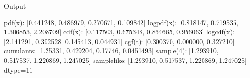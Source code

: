 \documentclass[letterpaper,10pt,english]{sphinxmanual}
\begin{document}
\begin{sphinxVerbatim}[commandchars=\\\{\}]
\end{sphinxVerbatim}

\sphinxAtStartPar
Output

\begin{sphinxVerbatim}[commandchars=\\\{\}]
pdf(x):      [0.441248, 0.486979, 0.270671, 0.109842]
logpdf(x):   [\PYGZhy{}0.818147, \PYGZhy{}0.719535, \PYGZhy{}1.306853, \PYGZhy{}2.208709]
cdf(x):      [0.117503, 0.675348, 0.864665, 0.956063]
logcdf(x):   [\PYGZhy{}2.141291, \PYGZhy{}0.392528, \PYGZhy{}0.145413, \PYGZhy{}0.044931]
cgf(t):      [\PYGZhy{}0.300370, 0.000000, 0.327210]
cumulants:   [1.25331, 0.429204, 0.17746, 0.0451493]
sample(\PYGZob{}4\PYGZcb{}): [1.293910, 0.517537, 1.220869, 1.247025]
sample\PYGZus{}like: [1.293910, 0.517537, 1.220869, 1.247025] dtype=11
\end{sphinxVerbatim}
\end{document}
